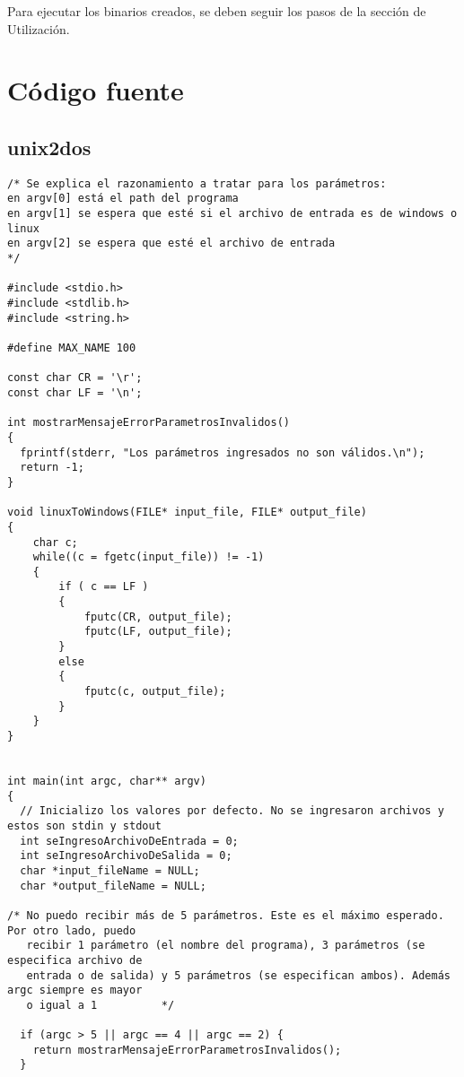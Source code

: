 \documentclass[a4paper,11pt]{article}
\begin{document}
Para ejecutar los binarios creados, se deben seguir los pasos de la secci\'on de Utilizaci\'on.

\section{C\'odigo fuente}
\subsection{unix2dos}
\begin{verbatim}
/* Se explica el razonamiento a tratar para los parámetros:
en argv[0] está el path del programa
en argv[1] se espera que esté si el archivo de entrada es de windows o linux
en argv[2] se espera que esté el archivo de entrada
*/

#include <stdio.h>
#include <stdlib.h>
#include <string.h>

#define MAX_NAME 100

const char CR = '\r';
const char LF = '\n';

int mostrarMensajeErrorParametrosInvalidos()
{
  fprintf(stderr, "Los parámetros ingresados no son válidos.\n");
  return -1;
}

void linuxToWindows(FILE* input_file, FILE* output_file)
{
	char c;
  	while((c = fgetc(input_file)) != -1)
  	{
  		if ( c == LF )
  		{
    		fputc(CR, output_file);
    		fputc(LF, output_file);
    	}
    	else
    	{
    		fputc(c, output_file);
    	}
  	}
}


int main(int argc, char** argv)
{
  // Inicializo los valores por defecto. No se ingresaron archivos y estos son stdin y stdout
  int seIngresoArchivoDeEntrada = 0;
  int seIngresoArchivoDeSalida = 0;
  char *input_fileName = NULL;
  char *output_fileName = NULL;

/* No puedo recibir más de 5 parámetros. Este es el máximo esperado. Por otro lado, puedo
   recibir 1 parámetro (el nombre del programa), 3 parámetros (se especifica archivo de 
   entrada o de salida) y 5 parámetros (se especifican ambos). Además argc siempre es mayor
   o igual a 1          */

  if (argc > 5 || argc == 4 || argc == 2) {
    return mostrarMensajeErrorParametrosInvalidos();
  }


\end{verbatim}
\end{document}
